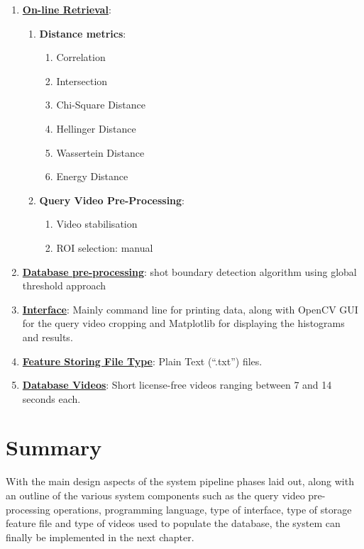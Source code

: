 \begin{enumerate}
    \item \underline{\textbf{On-line Retrieval}}: 
    \begin{enumerate}
        \item \textbf{Distance metrics}:
            \begin{enumerate}
                \item Correlation
                \item Intersection
                \item Chi-Square Distance
                \item Hellinger Distance
                \item Wassertein Distance
                \item Energy Distance
            \end{enumerate}
        \item \textbf{Query Video Pre-Processing}:
        \begin{enumerate}
            \item Video stabilisation
            \item ROI selection: manual
        \end{enumerate}
    \end{enumerate}
    
    \item \underline{\textbf{Database pre-processing}}: shot boundary detection algorithm using global threshold approach
    
    \item \underline{\textbf{Interface}}: Mainly command line for printing data, along with OpenCV GUI for the query video cropping and Matplotlib for displaying the histograms and results.
    
    \item \underline{\textbf{Feature Storing File Type}}: Plain Text (``.txt'') files.
    
    \item \underline{\textbf{Database Videos}}: Short license-free videos ranging between 7 and 14 seconds each.

\end{enumerate}


\section{Summary}

With the main design aspects of the system pipeline phases laid out, along with an outline of the various system components such as the query video pre-processing operations, programming language, type of interface, type of storage feature file and type of videos used to populate the database, the system can finally be implemented in the next chapter.
